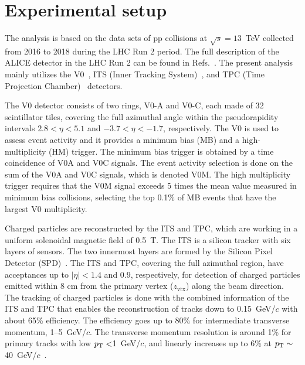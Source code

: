 

\section{Experimental setup}
\label{sec:experiment}

The analysis is based on the data sets of pp collisions at $\sqrt{s} = 13$~TeV collected from 2016 to 2018 during the LHC Run 2 period. The full description of the ALICE detector in the LHC Run 2 can be found in Refs.~\cite{Aamodt:2008zz,Abelev:2014ffa}. The present analysis mainly utilizes the V0~\cite{Abbas:2013taa}, ITS (Inner Tracking System)~\cite{aliceITS}, and TPC (Time Projection Chamber)~\cite{aliceTPC} detectors.

The V0 detector consists of two rings, V0-A and V0-C, each made of 32 scintillator tiles, covering the full azimuthal angle within the pseudorapidity intervals $2.8 < \eta < 5.1$ and $-3.7 < \eta < -1.7$, respectively. 
The V0 is used to assess event activity and it provides a minimum bias (MB) and a high-multiplicity (HM) trigger. The minimum bias trigger is obtained by a time coincidence of V0A and V0C signals. The event activity selection is done on the sum of the V0A and V0C signals, which is denoted V0M. The high multiplicity trigger requires that the V0M signal exceeds 5 times the mean value measured in minimum bias collisions, selecting the top 0.1\% of MB events that have the largest V0 multiplicity.


Charged particles are reconstructed by the ITS and TPC, which are working in a uniform solenoidal magnetic field of 0.5~T. The ITS is a silicon tracker with six layers of sensors. The two innermost layers are formed by the Silicon Pixel Detector (SPD)~\cite{Santoro2009:ALICESPD}.
The ITS and TPC, covering the full azimuthal region, have acceptances up to $|\eta| < 1.4$ and 0.9, respectively, for detection of charged particles emitted within 8 cm from the primary vertex ($z_\mathrm{vtx}$) along the beam direction. The tracking of charged particles is done with the combined information of the ITS and TPC that enables the reconstruction of tracks down to 0.15~GeV/$c$ with about 65\% efficiency. The efficiency goes up to 80\% for intermediate transverse momentum, 1--5~GeV/$c$. The transverse momentum resolution is around 1\% for primary tracks with low $p_\mathrm{T}<$1~GeV/$c$, and linearly increases up to 6\% at $p_\mathrm{T} \sim$ 40~GeV/$c$~\cite{Contin_2012:ITSPTRES}.


